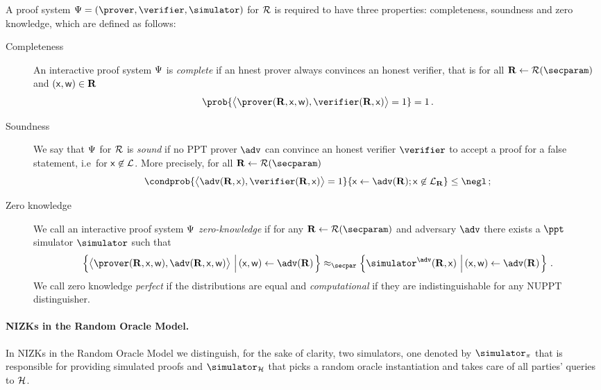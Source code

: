 \documentclass[runningheads]{llncs}
\theoremstyle{definition}
\begin{document}
A proof system $\proofsystem = (\prover, \verifier, \simulator)$ for $\mathcal{R}$ is required to have three properties: completeness, soundness and zero knowledge, which are defined as follows:
\begin{description}
	\item[Completeness] An interactive proof system $\mathrm{\Psi}$ is \emph{complete} if an hnest prover always convinces an honest verifier, that is for all $\REL \gets \RELGEN(\secparam)$ and $(\mathsf{x}, \mathsf{w}) \in \mathbf{R}$
	\[
		\prob{\ip{\prover (\REL, \inp, \wit)}{\verifier (\REL, \inp)} = 1} = 1\,.
	\]
	\item[Soundness] We say that $\mathrm{\Psi}$ for $\mathcal{R}$ is \emph{sound} if no PPT prover $\adv$ can convince an honest verifier $\verifier$ to accept a proof for a false statement, i.e~for $\mathsf{x} \not\in\mathcal{L}$. More precisely, for all $\REL \gets \RELGEN(\secparam)$
	\[
		\condprob{\ip{\adv(\REL, \inp)}{\verifier(\REL, \inp)} = 1}{\inp \gets \adv(\REL); \inp \not\in \LANG_\REL} \leq \negl\,;
	\]
	\item[Zero knowledge] We call an interactive proof system $\mathrm{\Psi}$ \emph{zero-knowledge} if for any $\REL \gets \RELGEN(\secparam)$ and adversary $\adv$ there exists a $\ppt$ simulator $\simulator$ such that
	\begin{multline*}
	  \left\{\ip{\prover(\REL, \inp, \wit)}{\adv(\REL, \inp, \wit)} \,\left|\, (\inp, \wit) \gets \adv(\REL)\vphantom{\simulator^\adv}\right.\right\} \approx_\secpar 
		\left\{\simulator^{\adv}(\REL, \inp)\,\left|\, (\inp, \wit) \gets \adv(\REL)\vphantom{\simulator^\adv}\right.\right\}\,.
	\end{multline*}
	We call zero knowledge \emph{perfect} if the distributions are equal and \emph{computational} if they are indistinguishable for any NUPPT distinguisher.
\end{description}

\paragraph{NIZKs in the Random Oracle Model.}
In NIZKs in the Random Oracle Model we distinguish, for the sake of clarity, two simulators, one denoted by $\simulator_\zkproof$ that is responsible for providing simulated proofs and $\simulator_\ro$ that picks a random oracle instantiation and takes care of all parties' queries to $\mathcal{H}$.
\end{document}
